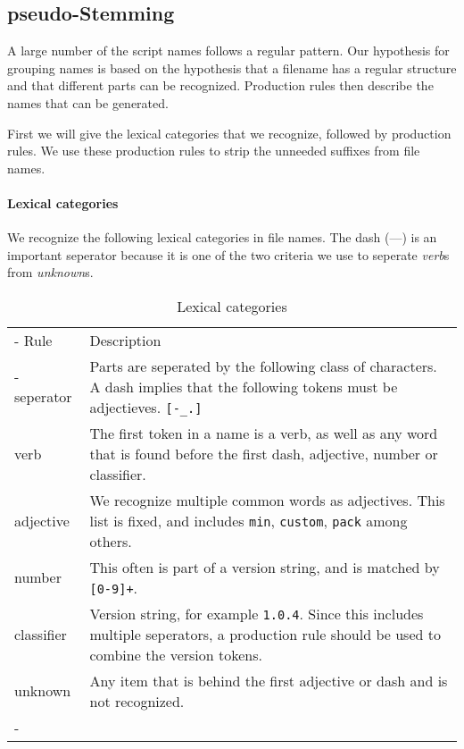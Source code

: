 \documentclass[11pt,a4paper,oneside]{scrartcl}
\begin{document}
\subsection{pseudo-Stemming}
A large number of the script names follows a regular pattern. Our hypothesis for grouping names is based on the hypothesis that a filename has a regular structure and that different parts can be recognized. Production rules then describe the names that can be generated.

First we will give the lexical categories that we recognize, followed by production rules. We use these production rules to strip the unneeded suffixes from file names.

\paragraph{Lexical categories}
We recognize the following lexical categories in file names. The dash (---) is an important seperator because it is one of the two criteria we use to seperate \emph{verb}s from \emph{unknown}s.

\begin{table}
	\begin{tabu} to 
		\everyrow{\tabucline-}
		\tabucline-
			\rowfont{\normalfont\bfseries}
			Rule 		& Description \\
		\tabucline-
			seperator 	& Parts are seperated by the following class of characters. A dash implies that the following tokens must be adjectieves. \texttt{[-\_.]} \\
			verb 		& The first token in a name is a verb, as well as any word that is found before the first dash, adjective, number or classifier. \\
			adjective 	& We recognize multiple common words as adjectives. This list is fixed, and includes \texttt{min}, \texttt{custom}, \texttt{pack} among others. \\
			number		& This often is part of a version string, and is matched by \texttt{[0-9]+}. \\
			classifier	& Version string, for example \texttt{1.0.4}. Since this includes multiple seperators, a production rule should be used to combine the version tokens. \\
			unknown 	& Any item that is behind the first adjective or dash and is not recognized. \\
		\tabucline-
	\end{tabu}
	\caption{\label{tab:lexical_categories}Lexical categories}
\end{table}
\end{document}

